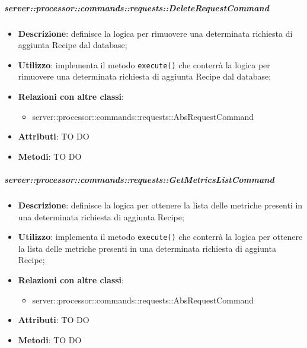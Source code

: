         \subparagraph{server::processor::commands::requests::DeleteRequestCommand} %
        \label{subp:bdsm_app_server_processor_commands_requests_deleterequestcommand}
        \begin{itemize}
          \item \textbf{Descrizione}: definisce la logica per rimuovere una determinata richiesta di aggiunta Recipe dal database;
          \item \textbf{Utilizzo}: implementa il metodo \texttt{execute()} che conterrà la logica per rimuovere una determinata richiesta di aggiunta Recipe dal database;
          \item \textbf{Relazioni con altre classi}:
            \begin{itemize}
              \item server::processor::commands::requests::AbsRequestCommand
            \end{itemize}
			\item \textbf{Attributi}: TO DO
			\item \textbf{Metodi}: TO DO
        \end{itemize}

        \subparagraph{server::processor::commands::requests::GetMetricsListCommand} %
        \label{subp:bdsm_app_server_processor_commands_requests_getmetricslistcommand}
        \begin{itemize}
          \item \textbf{Descrizione}: definisce la logica per ottenere la lista delle metriche presenti in una determinata richiesta di aggiunta Recipe;
          \item \textbf{Utilizzo}: implementa il metodo \texttt{execute()} che conterrà la logica per ottenere la lista delle metriche presenti in una determinata richiesta di aggiunta Recipe;
          \item \textbf{Relazioni con altre classi}:
            \begin{itemize}
              \item server::processor::commands::requests::AbsRequestCommand
            \end{itemize}
			\item \textbf{Attributi}: TO DO
			\item \textbf{Metodi}: TO DO
        \end{itemize}

